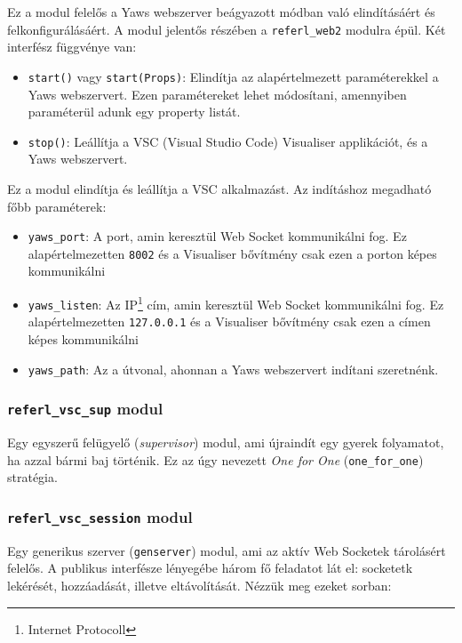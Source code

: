 Ez a modul felelős a Yaws webszerver beágyazott módban való elindításáért és felkonfigurálásáért. \cite{zacharyYawsBook}
A modul jelentős részében a \lstinline{referl_web2} modulra épül. Két interfész függvénye van:

\begin{itemize}
    \item \lstinline{start()} vagy \lstinline{start(Props)}: Elindítja az alapértelmezett paraméterekkel a Yaws webszervert. Ezen paramétereket lehet módosítani, amennyiben paraméterül adunk egy property listát.
    \item \lstinline{stop()}: Leállítja a VSC (Visual Studio Code) Visualiser applikációt, és a Yaws webszervert.
\end{itemize}
 
Ez a modul elindítja és leállítja a VSC alkalmazást. Az indításhoz megadható főbb paraméterek:

\begin{itemize}
    \item \lstinline{yaws_port}: A port, amin keresztül Web Socket kommunikálni fog. Ez alapértelmezetten \lstinline{8002} és a Visualiser bővítmény csak ezen a porton képes kommunikálni
    \item \lstinline{yaws_listen}: Az IP\footnote{Internet Protocoll} cím, amin keresztül Web Socket kommunikálni fog. Ez alapértelmezetten \lstinline{127.0.0.1} és a Visualiser bővítmény csak ezen a címen képes kommunikálni
    \item \lstinline{yaws_path}: Az a útvonal, ahonnan a Yaws webszervert indítani szeretnénk. 

\end{itemize}

\subsubsection{\lstinline{referl_vsc_sup} modul}

Egy egyszerű felügyelő (\textit{supervisor}) modul, ami újraindít egy gyerek folyamatot, ha azzal bármi baj történik. Ez az úgy nevezett \textit{One for One} (\lstinline{one_for_one}) stratégia. 

\subsubsection{\lstinline{referl_vsc_session} modul}

Egy generikus szerver (\lstinline{genserver}) modul, ami az aktív Web Socketek tárolásért 
felelős. A publikus interfésze lényegébe három fő feladatot lát el: socketetk lekérését, hozzáadását, illetve eltávolítását. Nézzük meg ezeket sorban:

